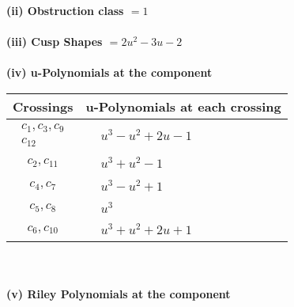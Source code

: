 \documentclass[1p]{elsarticle_modified}
\theoremstyle{definition}
\begin{document}
\flushleft \textbf{(ii) Obstruction class $= 1$}\\~\\
\flushleft \textbf{(iii) Cusp Shapes $= 2 u^2-3 u-2$}\\~\\
\newpage\renewcommand{\arraystretch}{1}
\flushleft \textbf{(iv) u-Polynomials at the component}\newline \\
\begin{tabular}{m{50pt}|m{274pt}}
Crossings & \hspace{64pt}u-Polynomials at each crossing \\
\hline $$\begin{aligned}c_{1},c_{3},c_{9}\\c_{12}\end{aligned}$$&$\begin{aligned}
&u^3- u^2+2 u-1
\end{aligned}$\\
\hline $$\begin{aligned}c_{2},c_{11}\end{aligned}$$&$\begin{aligned}
&u^3+u^2-1
\end{aligned}$\\
\hline $$\begin{aligned}c_{4},c_{7}\end{aligned}$$&$\begin{aligned}
&u^3- u^2+1
\end{aligned}$\\
\hline $$\begin{aligned}c_{5},c_{8}\end{aligned}$$&$\begin{aligned}
&u^3
\end{aligned}$\\
\hline $$\begin{aligned}c_{6},c_{10}\end{aligned}$$&$\begin{aligned}
&u^3+u^2+2 u+1
\end{aligned}$\\
\hline
\end{tabular}\\~\\
\newpage\renewcommand{\arraystretch}{1}
\flushleft \textbf{(v) Riley Polynomials at the component}\newline \\
\end{document}

